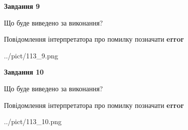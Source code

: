 \documentclass[12pt, ukrainian]{article}
\begin{document}
{{\begin {center}\textbf{Завдання 9}\end {center}}\par
Що буде виведено за виконання? \par
Повідомлення інтерпретатора про помилку позначати \textbf{error}

\begin{center}
	{../pict/113_9.png}
\end{center}
\newpage

{\begin {center}\textbf{Завдання 10}\end {center}}\par
Що буде виведено за виконання? \par
Повідомлення інтерпретатора про помилку позначати \textbf{error}

\begin{center}
	{../pict/113_10.png}
\end{center}
\newpage

}
\end{document}
